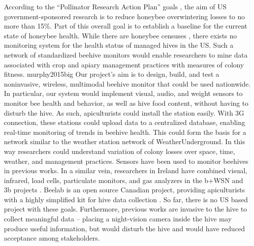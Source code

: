 According to the “Pollinator Research Action Plan” goals \cite{national2015report}, the aim of US government-sponsored research is to reduce honeybee overwintering losses to no more than 15\%. Part of this overall goal is to establish a baseline for the current state of honeybee health. While there are honeybee censuses \cite{vanengelsdorp2011survey}, there exists no monitoring system for the health status of managed hives in the US. Such a network of standardized beehive monitors would enable researchers to mine data associated with crop and apiary management practices with measures of colony fitness.  
murphy2015big
Our project’s aim is to design, build, and test a noninvasive, wireless, multimodal beehive monitor that could be used nationwide. In particular, our system would implement visual, audio, and weight sensors to monitor bee health and behavior, as well as hive food content, without having to disturb the hive. As such, apiculturists could install the station easily. With 3G connection, these stations could upload data to a centralized database, enabling real-time monitoring of trends in beehive health. This could form the basis for a network similar to the weather station network of WeatherUnderground. In this way researchers could understand variation of colony losses over space, time, weather, and management practices.
Sensors have been used to monitor beehives in previous works. In a similar vein, researchers in Ireland have combined visual, infrared, load cells, particulate monitors, and gas analyzers in the b+WSN and 3b projects \cite{murphy2015big, murphy2015b+wsn}. Beelab is an open source Canadian project, providing apiculturists with a highly simplified kit for hive data collection \cite{phillips2014testing}. So far, there is no US based project with these goals. Furthermore, previous works are invasive to the hive to collect meaningful data – placing a night-vision camera inside the hive may produce useful information,  but would disturb the hive and would have reduced acceptance among stakeholders.

